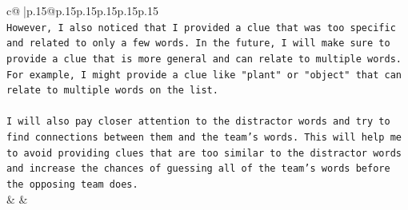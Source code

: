 \documentclass{article}
\begin{document}
{\begin{supertabular}{c@{$\;$}|p{.15\linewidth}@{}p{.15\linewidth}p{.15\linewidth}p{.15\linewidth}p{.15\linewidth}p{.15\linewidth}}
{{{\\ 
\texttt{However, I also noticed that I provided a clue that was too specific and related to only a few words. In the future, I will make sure to provide a clue that is more general and can relate to multiple words. For example, I might provide a clue like "plant" or "object" that can relate to multiple words on the list.} \\
\\ 
\texttt{I will also pay closer attention to the distractor words and try to find connections between them and the team's words. This will help me to avoid providing clues that are too similar to the distractor words and increase the chances of guessing all of the team's words before the opposing team does.} \\
            }
        }
    }
    & & \\ \\

\end{supertabular}
}
\end{document}
